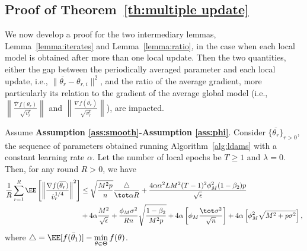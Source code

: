 \documentclass[nohyperref]{article}
\theoremstyle{plain}
\theoremstyle{definition}
\theoremstyle{remark}
\begin{document}
\subsection{Proof of Theorem~\ref{th:multiple update}} \label{app:proofmain}



We now develop a proof for the two intermediary lemmas, Lemma~\ref{lemma:iterates} and Lemma~\ref{lemma:ratio}, in the case when each local model is obtained after more than one local update.
Then the two quantities, either the gap between the periodically averaged parameter and each local update, i.e., $\| \overline{\theta_r} - \theta_{r,i} \|^2$, and the ratio of the average gradient, more particularly its relation to the gradient of the average global model (i.e., $\left\| \frac{\overline{\nabla}f(\theta_r)}{\sqrt{ v_r^t}} \right\|$ and $ \left\| \frac{\nabla f(\overline{\theta_r})}{\sqrt{ v_r^t}} \right\| $), are impacted. 

\begin{Theorem*}
Assume \textbf{Assumption \ref{ass:smooth}-Assumption \ref{ass:phi}}. Consider $\{\overline{\theta_r}\}_{r>0}$, the sequence of parameters obtained running Algorithm~\ref{alg:ldams} with a constant learning rate $\alpha$. Let the number of local epochs be $T \geq 1$ and $\lambda = 0$. Then, for any round $R > 0$, we have
\begin{align}
  \frac{1}{R}\sum_{r=1}^R  \EE\left[ \left\| \frac{\nabla f(\overline{\theta_r})}{\hat v_r^{1/4}}   \right \|^2 \right] &\leq    \sqrt{\frac{M^2 p}{n}}  \frac{ \triangle}{\tot \alpha R}+\frac{4\alpha \alpha^2 L M^2 (T-1)^2 \phi_M^2 (1-\beta_2)p}{\sqrt{\epsilon}} \\\notag
&+4\alpha \frac{M^2}{\sqrt{\epsilon}} +      \frac{\phi_M   \sigma^2}{R n} \sqrt{\frac{1 - \beta_2}{M^2 p}  } +4\alpha \left[\phi_M \frac{\tot \sigma^2}{\sqrt{n}}\right]     + 4\alpha \left[ \phi_M^2\sqrt{M^2+p\sigma^2} \right],\notag
\end{align}
where $\triangle=\EE[f(\bar{\theta}_1)]  - \min \limits_{\theta \in \Theta} f(\theta)$.
\end{Theorem*}
\end{document}
